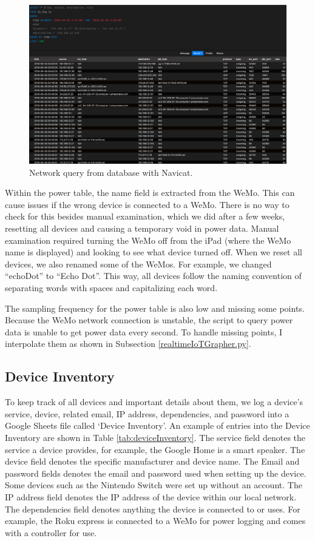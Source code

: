\begin{figure}[H]
    \centering
    \includegraphics[width=1\textwidth]{figures/navicatNetworkQuery.png}
    \caption{Network query from database with Navicat.}
    \label{fig:navicatNetworkQuery}
\end{figure}

Within the power table, the name field is extracted from the WeMo. This can cause issues if the wrong device is connected to a WeMo. There is no way to check for this besides manual examination, which we did after a few weeks, resetting all devices and causing a temporary void in power data. Manual examination required turning the WeMo off from the iPad (where the WeMo name is displayed) and looking to see what device turned off. When we reset all devices, we also renamed some of the WeMos. For example, we changed ``echoDot'' to ``Echo Dot''. This way, all devices follow the naming convention of separating words with spaces and capitalizing each word.

The sampling frequency for the power table is also low and missing some points. Because the WeMo network connection is unstable, the script to query power data is unable to get power data every second. To handle missing points, I interpolate them as shown in Subsection \ref{realtimeIoTGrapher.py}.

\subsection{Device Inventory}
\label{Device Inventory}
To keep track of all devices and important details about them, we log a device's service, device, related email, IP address, dependencies, and password into a Google Sheets file called `Device Inventory'. An example of entries into the Device Inventory are shown in Table \ref{tab:deviceInventory}. The service field denotes the service a device provides, for example, the Google Home is a smart speaker. The device field denotes the specific manufacturer and device name. The Email and password fields denotes the email and password used when setting up the device. Some devices such as the Nintendo Switch were set up without an account. The IP address field denotes the IP address of the device within our local network. The dependencies field denotes anything the device is connected to or uses. For example, the Roku express is connected to a WeMo for power logging and comes with a controller for use.

